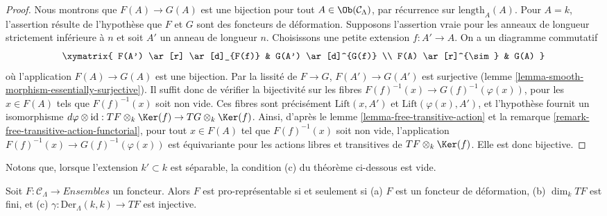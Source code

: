 \begin{proof}
Nous montrons que $F(A) \to G(A)$ est une bijection pour tout $A \in
\Ob(\mathcal{C}_\Lambda)$, par récurrence sur
$\text{length}_A(A)$. Pour $A = k$, l'assertion résulte de
l'hypothèse que $F$ et $G$ sont des foncteurs de déformation. Supposons
l'assertion vraie pour les anneaux de longueur strictement inférieure à $n$ et
soit $A'$ un anneau de longueur $n$. Choisissons une petite extension
$f : A' \to A$. On a un diagramme commutatif
$$
\xymatrix{
F(A') \ar[r] \ar[d]_{F(f)} & G(A') \ar[d]^{G(f)} \\
F(A) \ar[r]^{\sim} & G(A)
}
$$
où l'application $F(A) \to G(A)$ est une bijection. Par la lissité de $F
\to G$, $F(A') \to G(A')$ est surjective (lemme
\ref{lemma-smooth-morphism-essentially-surjective}). Il suffit donc de vérifier
la bijectivité sur les fibres $F(f)^{-1}(x) \to
G(f)^{-1}(\varphi(x))$, pour les $x \in F(A)$ tels que $F(f)^{-1}(x)$ soit
non vide. Ces fibres sont précisément $\text{Lift}(x, A')$ et
$\text{Lift}(\varphi(x), A')$, et l'hypothèse fournit un isomorphisme
$d\varphi \otimes \text{id} :
TF \otimes_k \Ker(f)  \to TG \otimes_k \Ker(f)$.
Ainsi, d'après le lemme \ref{lemma-free-transitive-action} et la remarque
\ref{remark-free-transitive-action-functorial}, pour tout $x \in F(A)$ tel que
$F(f)^{-1}(x)$ soit non vide, l'application
$F(f)^{-1}(x) \to G(f)^{-1}(\varphi(x))$ est équivariante pour les actions
libres et transitives de
$TF \otimes_k \Ker(f)$. Elle est donc bijective.
\end{proof}

\noindent
Notons que, lorsque l'extension $k' \subset k$ est séparable, la condition (c)
du théorème ci-dessous est vide.

\begin{theorem}
\label{theorem-Schlessinger-prorepresentability}
Soit $F: \mathcal{C}_\Lambda \to \textit{Ensembles}$ un foncteur. Alors $F$ est
pro-représentable si et seulement si (a) $F$ est un foncteur de déformation,
(b) $\dim_k TF$ est fini, et (c) $\gamma : \text{Der}_\Lambda(k, k) \to TF$
est injective.
\end{theorem}

